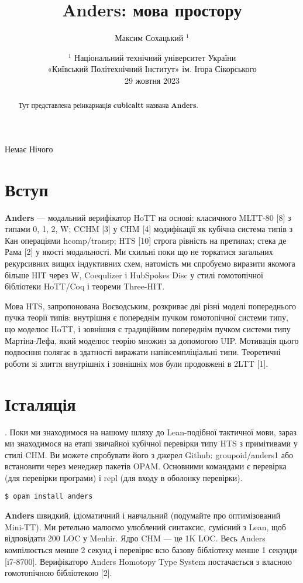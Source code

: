 \documentclass{article}
\theoremstyle{definition}
\begin{document}
\newpage Немає Нічого \newpage
\title{Anders: мова простору}
\author{Максим Сохацький $^1$}
\date{ \small $^1$ Національний технічний університет України \\
       «Київський Політехнічний Інститут» ім. Ігора Сікорського \\
       29 жовтня 2023 }
\maketitle

\begin{abstract}
Тут представлена реінкарнація \textbf{cubicaltt} названа \textbf{Anders}.
\end{abstract}

\section*{Вступ}

\textbf{Anders} — модальний верифікатор HoTT на основі: класичного MLTT-80 [8]
з типами 0, 1, 2, W; CCHM [3] у CHM [4] модифікації як кубічна
система типів з Кан операціями hcomp/transp; HTS [10] строга рівність
на претипах; стека де Рама [2] у якості модальності. Ми схильні поки
що не торкатися загальних рекурсивних вищих індуктивних схем,
натомість ми спробуємо виразити якомога більше HIT через W, Coequlizer
і HubSpokes Disc у стилі гомотопічної бібліотеки HoTT/Coq і теореми Three-HIT.

Мова HTS, запропонована Воєводським, розкриває дві різні моделі
попереднього пучка теорії типів: внутрішня є попереднім пучком
гомотопічної системи типу, що моделює HoTT, і зовнішня є традиційним
попереднім пучком системи типу Мартіна-Лефа, який моделює теорію множин
за допомогою UIP. Мотивація цього подвоєння полягає в здатності виражати
напівсемпліціальні типи. Теоретичні роботи зі злиття внутрішніх і
зовнішніх мов були продовжені в 2LTT [1].

\newpage
\section{Істаляція}. Поки ми знаходимося на нашому шляху до Lean-подібної
тактичної мови, зараз ми знаходимося на етапі звичайної кубічної перевірки
типу HTS з примітивами у стилі CHM. Ви можете спробувати його з джерел
Github: groupoid/anders1 або встановити через менеджер пакетів OPAM.
Основними командами є перевірка (для перевірки програми) і repl (для входу в оболонку перевірки).
\begin{lstlisting}
$ opam install anders
\end{lstlisting}

\textbf{Anders} швидкий, ідіоматичний і навчальний (подумайте про оптимізований Mini-TT).
Ми ретельно малюємо улюблений синтаксис, сумісний з Lean, щоб відповідати 200
LOC у Menhir. Ядро CHM — це 1K LOC. Весь Anders компілюється менше 2 секунд і
перевіряє всю базову бібліотеку менше 1 секунди [i7-8700]. Верифікаторо Anders
Homotopy Type System постачається з власною гомотопічною бібліотекою [2].
\end{document}
